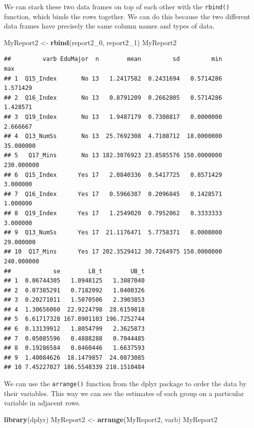 \documentclass[
]{article}
\newenvironment{Shaded}{\begin{snugshade}}{\end{snugshade}}
\newcommand{\DecValTok}[1]{\textcolor[rgb]{0.00,0.00,0.81}{#1}}
\newcommand{\KeywordTok}[1]{\textcolor[rgb]{0.13,0.29,0.53}{\textbf{#1}}}
\newcommand{\NormalTok}[1]{#1}
\newcommand{\StringTok}[1]{\textcolor[rgb]{0.31,0.60,0.02}{#1}}
\begin{document}
We can stack these two data frames on top of each other with the \texttt{rbind()} function, which binds the rows together. We can do this because the two different data frames have precisely the same column names and types of data.

\begin{Shaded}
\begin{Highlighting}[]
\NormalTok{MyReport2 <-}\StringTok{ }\KeywordTok{rbind}\NormalTok{(report2_}\DecValTok{0}\NormalTok{, report2_}\DecValTok{1}\NormalTok{)}
\NormalTok{MyReport2}
\end{Highlighting}
\end{Shaded}

\begin{verbatim}
##         varb EduMajor  n        mean         sd         min        max
## 1  Q15_Index       No 13   1.2417582  0.2431694   0.5714286   1.571429
## 2  Q16_Index       No 13   0.8791209  0.2662805   0.5714286   1.428571
## 3  Q19_Index       No 13   1.9487179  0.7308817   0.0000000   2.666667
## 4  Q13_NumSs       No 13  25.7692308  4.7108712  18.0000000  35.000000
## 5   Q17_Mins       No 13 182.3076923 23.8585576 150.0000000 230.000000
## 6  Q15_Index      Yes 17   2.0840336  0.5417725   0.8571429   3.000000
## 7  Q16_Index      Yes 17   0.5966387  0.2096845   0.1428571   1.000000
## 8  Q19_Index      Yes 17   1.2549020  0.7952062   0.3333333   3.000000
## 9  Q13_NumSs      Yes 17  21.1176471  5.7758371   8.0000000  29.000000
## 10  Q17_Mins      Yes 17 202.3529412 30.7264975 150.0000000 240.000000
##            se        LB_t        UB_t
## 1  0.06744305   1.0948125   1.3887040
## 2  0.07385291   0.7182092   1.0400326
## 3  0.20271011   1.5070506   2.3903853
## 4  1.30656060  22.9224798  28.6159818
## 5  6.61717328 167.8901103 196.7252744
## 6  0.13139912   1.8054799   2.3625873
## 7  0.05085596   0.4888288   0.7044485
## 8  0.19286584   0.8460446   1.6637593
## 9  1.40084626  18.1479857  24.0873085
## 10 7.45227027 186.5548339 218.1510484
\end{verbatim}

We can use the \texttt{arrange()} function from the dplyr package to order the data by their variables. This way we can see the estimates of each group on a particular variable in adjacent rows.

\begin{Shaded}
\begin{Highlighting}[]
\KeywordTok{library}\NormalTok{(dplyr)}
\NormalTok{MyReport2 <-}\StringTok{ }\KeywordTok{arrange}\NormalTok{(MyReport2, varb)}
\NormalTok{MyReport2}
\end{Highlighting}
\end{Shaded}
\end{document}
